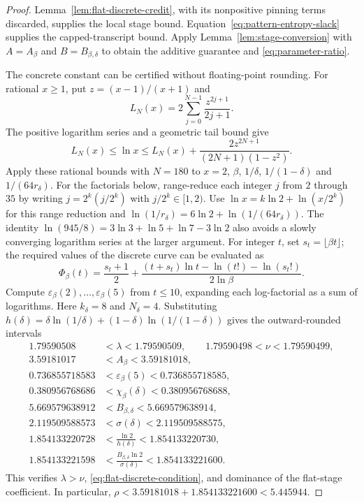 \begin{proof}
Lemma~\ref{lem:flat-discrete-credit}, with its nonpositive pinning terms
discarded, supplies the local stage bound. Equation~\eqref{eq:pattern-entropy-slack}
supplies the capped-transcript bound. Apply
Lemma~\ref{lem:stage-conversion} with $A=A_\beta$ and
$B=B_{\beta,\delta}$ to obtain the additive guarantee and
\eqref{eq:parameter-ratio}.

The concrete constant can be certified without floating-point
rounding. For rational $x\ge1$, put $z=(x-1)/(x+1)$ and
\[
 L_N(x)=2\sum_{j=0}^{N-1}\frac{z^{2j+1}}{2j+1}.
\]
The positive logarithm series and a geometric tail bound give
\begin{equation}\label{eq:rational-log-bounds}
 L_N(x)\le\ln x\le L_N(x)+
 \frac{2z^{2N+1}}{(2N+1)(1-z^2)}.
\end{equation}
Apply these rational bounds with $N=180$ to
$x=2$, $\beta$, $1/\delta$, $1/(1-\delta)$ and
$1/(64r_\delta)$. For the factorials below, range-reduce each
integer $j$ from $2$ through $35$ by writing
$j=2^k(j/2^k)$ with $j/2^k\in[1,2)$.
Use $\ln x=k\ln2+\ln(x/2^k)$ for this range reduction and
$\ln(1/r_\delta)=6\ln2+\ln(1/(64r_\delta))$.
The identity
$\ln(945/8)=3\ln3+\ln5+\ln7-3\ln2$ also avoids a slowly
converging logarithm series at the larger argument.
For integer $t$, set $s_t=\lfloor\beta t\rfloor$; the required
values of the discrete curve can be evaluated as
\[
 \Phi_\beta(t)=\frac{s_t+1}{2}
  +\frac{(t+s_t)\ln t-\ln(t!)-\ln(s_t!)}{2\ln\beta}.
\]
Compute $\varepsilon_\beta(2),\ldots,\varepsilon_\beta(5)$
from $t\le10$, expanding each log-factorial as a sum of logarithms.
Here $k_\delta=8$ and $N_\delta=4$. Substituting
$h(\delta)=\delta\ln(1/\delta)+(1-\delta)\ln(1/(1-\delta))$
gives the outward-rounded intervals
\[
 \begin{aligned}
 1.79590508&<\lambda<1.79590509,\qquad
 1.79590498<\nu<1.79590499,\\
 3.59181017&<A_\beta<3.59181018,\\
 0.736855718583&<\varepsilon_\beta(5)<0.736855718585,\\
 0.380956768686&<\chi_\beta(\delta)<0.380956768688,\\
 5.669579638912&<B_{\beta,\delta}<5.669579638914,\\
 2.119509588573&<\sigma(\delta)<2.119509588575,\\
 1.854133220728&<\frac{\ln2}{h(\delta)}<1.854133220730,\\
 1.854133221598&<\frac{B_{\beta,\delta}\ln2}{\sigma(\delta)}
               <1.854133221600.
 \end{aligned}
\]
This verifies $\lambda>\nu$,
\eqref{eq:flat-discrete-condition}, and dominance of the flat-stage
coefficient. In particular,
$\rho<3.59181018+1.854133221600<5.445944$.
\end{proof}

